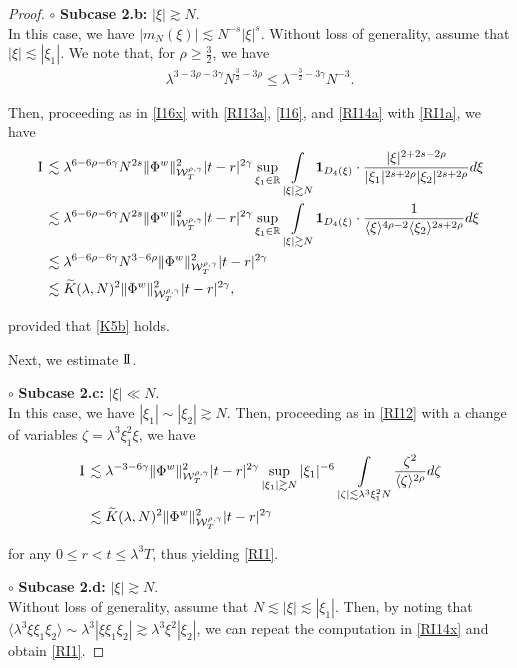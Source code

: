 \documentclass[letterpaper, 11pt,  reqno]{amsart}
\DeclareMathOperator*{\intt}{\int}
\newcommand{\1}{\hspace{0.5mm}\text{I}\hspace{0.5mm}}
\newcommand{\II}{\text{I \hspace{-2.8mm} I} }
\newcommand{\noi}{\noindent}
\newcommand{\R}{\mathbb{R}}
\newcommand{\g}{\gamma}
\newcommand{\ld}{\lambda}
\newcommand{\wt}{\widetilde}
\newcommand{\les}{\lesssim}
\newcommand{\ges}{\gtrsim}
\newcommand{\jb}[1]
{\langle #1 \rangle}
\newcommand{\ind}{\mathbf 1}
\newcommand{\W}{\mathcal{W}}
\newcommand{\z}{\zeta}
\numberwithin{equation}{section}
\numberwithin{theorem}{section}
\begin{document}
\begin{proof}
\medskip


\noi
$\circ$ {\bf Subcase 2.b:}  $|\xi| \ges N$.\\
\indent
In this case, we have   $|m_N(\xi)| \les  N^{-s} |\xi|^{s}$.
Without loss of generality, assume that $|\xi|\les |\xi_1|$.
We note that, for $\rho \ge \frac 32$, we have 
\begin{align}
\ld^{3- 3\rho-3\g} N^{\frac 32 - 3\rho}
\le
\ld^{ - \frac 32  - 3\g} N^{-3}.
\label{RI14a}
\end{align}

\noi
Then, 
proceeding as in \eqref{I16x}
with 
 \eqref{RI13a}, 
\eqref{I16}, 
and 
\eqref{RI14a} with \eqref{RI1a}, we have
\begin{align}
\begin{split}
\1
&\les 
\ld^{6-  6\rho  - 6\g}N^{2s }
\| \Phi^{w} \|^2_{\W_{T}^{\rho, \g}} 
|t-r|^{2\g} 
\sup_{\xi_1 \in \R}
\intt_{|\xi|\ges N}
\ind_{D_4(\xi)}\cdot
\frac{|\xi|^{2+2s-2\rho} }{|\xi_1|^{2s+2\rho}|\xi_2|^{2s+2\rho}}d\xi \\
&\les 
\ld^{6-  6\rho  - 6\g}N^{2s }
\| \Phi^{w} \|^2_{\W_{T}^{\rho, \g}} 
|t-r|^{2\g} 
\sup_{\xi_1 \in \R}
\intt_{|\xi|\ges N}
\ind_{D_4(\xi)}\cdot
\frac{1 }{\jb{\xi}^{4\rho - 2}\jb{\xi_2}^{2s+2\rho}}d\xi \\
 &\les 
\ld^{6-6\rho -6\g}N^{3-6\rho }
 \| \Phi^{w} \|^2_{\W_{T}^{\rho, \g}}  
|t-r|^{2\g}\\
 &\les 
\wt K(\ld, N)^2
 \| \Phi^{w} \|^2_{\W_{T}^{\rho, \g}}  
|t-r|^{2\g}, 
\end{split}
\label{RI14x}
\end{align}

\noi
provided that 
  \eqref{K5b} holds.




\medskip

Next, we  estimate $\II$.


\medskip

\noi
$\circ$ {\bf Subcase 2.c:}  $|\xi| \ll N$.\\
\indent
In this case, we have 
  $|\xi_1|\sim |\xi_2|\ges N$.
Then, proceeding as in \eqref{RI12}
with 
a change of variables $\z = \ld^3 \xi_1^2 \xi$, we have 
\begin{align*}
\1
& \les 
\ld^{-3- 6\g}
 \| \Phi^{w} \|^2_{\W_{T}^{\rho, \g}}  
|t-r|^{2\g}
\sup_{|\xi_1|\ges N}|\xi_1|^{-6}
\intt_{ |\z|\les \ld^3 \xi_1^2N } \frac{\z^{2}}{\jb{\z}^{2\rho}}d \z\\
 &\les 
\wt K(\ld, N)^2
 \| \Phi^{w} \|^2_{\W_{T}^{\rho, \g}}  
|t-r|^{2\g}
\end{align*}

\noi
for any $0\leq r<t\leq \ld^3T$, 
thus yielding \eqref{RI1}.




\medskip

\noi
$\circ$ {\bf Subcase 2.d:}  $|\xi| \ges N$.\\
\indent
Without loss of generality, assume that $N \les |\xi| \les |\xi_1|$.
Then, by noting
that $\jb{\ld^3 \xi \xi_1 \xi_2} \sim 
\ld^3 |\xi \xi_1 \xi_2|
\ges \ld^3 \xi^2 |\xi_2|$, 
we can repeat the computation in \eqref{RI14x}
and obtain \eqref{RI1}.
\end{proof}
\end{document}
